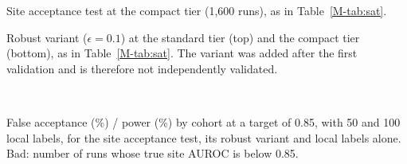 \begin{table}[width=\linewidth,pos=tbp]
\caption{Site acceptance test at the compact tier (1,600 runs), as in
Table~\ref{M-tab:sat}.}
\label{tab:sat-C}
\footnotesize
\setlength{\tabcolsep}{3pt}

\end{table}

\begin{table}[width=\linewidth,pos=tbp]
\caption{Robust variant ($\epsilon=0.1$) at the standard tier (top) and the
compact tier (bottom), as in Table~\ref{M-tab:sat}. The variant was added after
the first validation and is therefore not independently validated.}
\label{tab:sat-robust}
\footnotesize
\setlength{\tabcolsep}{3pt}
\\[6pt]

\end{table}

\begin{table}[width=\linewidth,pos=tbp]
\caption{False acceptance (\%) / power (\%) by cohort at a target of 0.85, with
50 and 100 local labels, for the site acceptance test, its robust variant and
local labels alone. Bad: number of runs whose true site AUROC is below 0.85.}
\label{tab:sat-cohorts}
\footnotesize
\setlength{\tabcolsep}{3pt}

\end{table}
